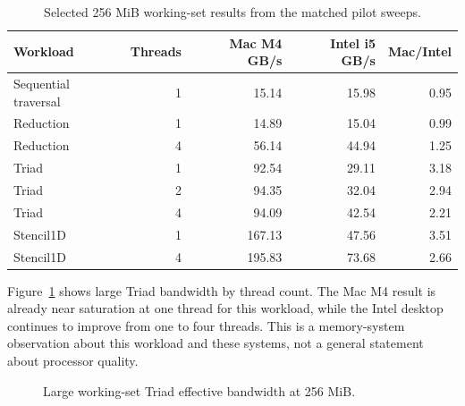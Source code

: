 \documentclass[11pt]{article}
\begin{document}
\begin{table}[htbp]
\caption{Selected 256 MiB working-set results from the matched pilot sweeps.}
\label{tab:large-summary}
\centering
\small
\begin{tabular}{lrrrr}
\toprule
Workload & Threads & Mac M4 GB/s & Intel i5 GB/s & Mac/Intel \\
\midrule
Sequential traversal & 1 & 15.14 & 15.98 & 0.95 \\
Reduction & 1 & 14.89 & 15.04 & 0.99 \\
Reduction & 4 & 56.14 & 44.94 & 1.25 \\
Triad & 1 & 92.54 & 29.11 & 3.18 \\
Triad & 2 & 94.35 & 32.04 & 2.94 \\
Triad & 4 & 94.09 & 42.54 & 2.21 \\
Stencil1D & 1 & 167.13 & 47.56 & 3.51 \\
Stencil1D & 4 & 195.83 & 73.68 & 2.66 \\
\bottomrule
\end{tabular}
\end{table}

Figure~\ref{fig:triad-bars} shows large Triad bandwidth by thread count. The Mac M4 result is already near saturation at one thread for this workload, while the Intel desktop continues to improve from one to four threads. This is a memory-system observation about this workload and these systems, not a general statement about processor quality.

\begin{figure}[htbp]
\centering
{}
\caption{Large working-set Triad effective bandwidth at 256 MiB.}
\label{fig:triad-bars}
\end{figure}
\end{document}
